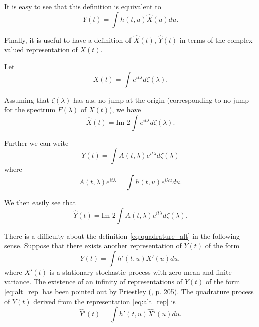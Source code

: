 \documentclass{article}
\begin{document}
It is easy to see that this definition is equivalent to
\begin{equation}
\label{eq:quadrature_alt}
\hat{Y}(t) = \int h(t, u)\hat{X}(u)du.
\end{equation}

Finally, it is useful to have a definition of $\hat{X}(t)$, $\hat{Y}(t)$ in terms of the
complex-valued representation of $X(t)$.

Let
\begin{equation}
\label{eq:complex_rep}
X(t) = \int e^{it\lambda}d\zeta(\lambda).
\end{equation}

Assuming that $\zeta(\lambda)$ has a.s. no jump at the origin (corresponding to no jump
for the spectrum $F(\lambda)$ of $X(t)$), we have
\begin{equation}
\label{eq:x_hat_complex}
\hat{X}(t) = \text{Im } 2 \int e^{it\lambda}d\zeta(\lambda).
\end{equation}

Further we can write
\begin{equation}
\label{eq:y_complex}
Y(t) = \int A(t, \lambda)e^{it\lambda}d\zeta(\lambda)
\end{equation}
where
\begin{equation}
\label{eq:a_t_lambda}
A(t, \lambda)e^{it\lambda} = \int h(t, u)e^{i\lambda u}du.
\end{equation}

We then easily see that
\begin{equation}
\label{eq:y_hat_complex}
\hat{Y}(t) = \text{Im } 2 \int A(t, \lambda)e^{it\lambda}d\zeta(\lambda).
\end{equation}

There is a difficulty about the definition \eqref{eq:quadrature_alt} in the following sense. Suppose
that there exists another representation of $Y(t)$ of the form
\begin{equation}
\label{eq:alt_rep}
Y(t) = \int h'(t, u)X'(u)du,
\end{equation}
where $X'(t)$ is a stationary stochastic process with zero mean and finite variance.
The existence of an infinity of representations of $Y(t)$ of the form \eqref{eq:alt_rep} has been
pointed out by Priestley (\cite{priestley1965}, p. 205). The quadrature process of $Y(t)$ derived
from the representation \eqref{eq:alt_rep} is
\begin{equation}
\label{eq:alt_quadrature}
\hat{Y}'(t) = \int h'(t, u)\hat{X}'(u)du.
\end{equation}
\end{document}
